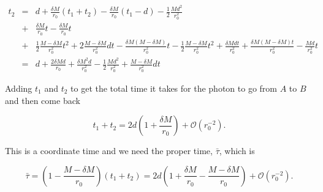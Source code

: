 \documentclass[aps,showpacs,onecolumn,floats,prd,superscriptaddress,nofootinbib]{revtex4-1}
\begin{document}
\begin{eqnarray}
	t_2 & = & d + \frac{\delta M}{r_0} (t_1 + t_2) - \frac{\delta M}{r_0} (t_1 - d) - \frac{1}{2} \frac{Md^2}{r_0^2}	\label{t2A7}	\\
	& + & \frac{\delta M}{r_0}t - \frac{\delta M}{r_0} t	\label{t2A8}	\\
	& + & \frac{1}{2} \frac{M- \delta M}{r_0^2} t^2 + 2 \frac{M- \delta M}{r_0^2} dt - \frac{\delta M(M - \delta M)}{r_0^2} t - \frac{1}{2} \frac{M - \delta M}{r_0^2} t^2 + \frac{\delta M dt}{r_0^2} + \frac{\delta M(M-\delta M)t}{r_0^2}  - \frac{Md}{r_0^2} t	\label{t2A9}	\\
	& = & d + \frac{2 \delta Md}{r_0} +\frac{\delta M^2 d}{r_0^2} - \frac{1}{2} \frac{Md^2}{r_0^2} + \frac{M - \delta M}{r_0^2} dt
\end{eqnarray}

Adding $t_1$ and $t_2$ to get the total time it takes for the photon to go from $A$ to $B$ and then come back 

\begin{equation}
	t_1 + t_2 = 2d \left( 1 + \frac{\delta M}{r_0} \right) + \mathcal{O}(r_0^{-2}).
\end{equation}

This is a coordinate time and we need the proper time, $\bar{\tau}$, which is 

\begin{equation}
	\bar{\tau} = \left( 1 - \frac{M- \delta M}{r_0} \right) (t_1 + t_2) = 2d \left( 1+ \frac{\delta M}{r_0} - \frac{M - \delta M}{r_0} \right) + \mathcal{O}(r_0^{-2}).
\end{equation}
\end{document}
